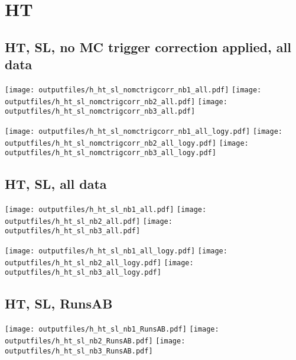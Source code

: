 \documentclass[11pt]{article}
\begin{document}
   \section{HT}
     \subsection{ HT, SL, no MC trigger correction applied, all data}

    \noindent
     \texttt{[image: outputfiles/h\_ht\_sl\_nomctrigcorr\_nb1\_all.pdf]}
     \texttt{[image: outputfiles/h\_ht\_sl\_nomctrigcorr\_nb2\_all.pdf]}
     \texttt{[image: outputfiles/h\_ht\_sl\_nomctrigcorr\_nb3\_all.pdf]}

    \noindent
     \texttt{[image: outputfiles/h\_ht\_sl\_nomctrigcorr\_nb1\_all\_logy.pdf]}
     \texttt{[image: outputfiles/h\_ht\_sl\_nomctrigcorr\_nb2\_all\_logy.pdf]}
     \texttt{[image: outputfiles/h\_ht\_sl\_nomctrigcorr\_nb3\_all\_logy.pdf]}



    \subsection{ HT, SL, all data}

    \noindent
     \texttt{[image: outputfiles/h\_ht\_sl\_nb1\_all.pdf]}
     \texttt{[image: outputfiles/h\_ht\_sl\_nb2\_all.pdf]}
     \texttt{[image: outputfiles/h\_ht\_sl\_nb3\_all.pdf]}

    \noindent
     \texttt{[image: outputfiles/h\_ht\_sl\_nb1\_all\_logy.pdf]}
     \texttt{[image: outputfiles/h\_ht\_sl\_nb2\_all\_logy.pdf]}
     \texttt{[image: outputfiles/h\_ht\_sl\_nb3\_all\_logy.pdf]}


    \subsection{ HT, SL, RunsAB}

    \noindent
     \texttt{[image: outputfiles/h\_ht\_sl\_nb1\_RunsAB.pdf]}
     \texttt{[image: outputfiles/h\_ht\_sl\_nb2\_RunsAB.pdf]}
     \texttt{[image: outputfiles/h\_ht\_sl\_nb3\_RunsAB.pdf]}
\end{document}
